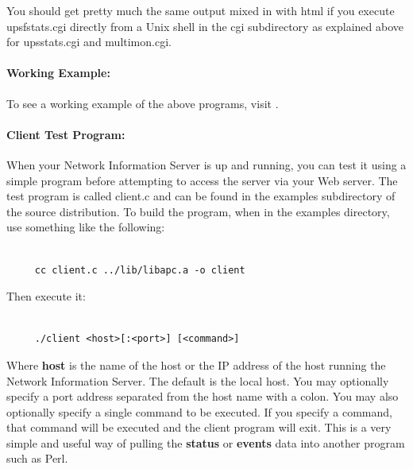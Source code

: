{{{{{{{{You should get pretty much the same output mixed in with html if you execute
upsfstats.cgi directly from a Unix shell in the cgi subdirectory as explained
above for upsstats.cgi and multimon.cgi. 

\label{Working-Example}

\paragraph*{Working Example:}

\label{index-CGI_002c-working-example-134}
\label{index-Example_002c-CGI-135}
To see a working example of the above programs, visit 
. 

\label{Client-Test-Program}

\paragraph*{Client Test Program:}

\label{index-Client-Test-program-136}
When your Network Information Server is up and running, you can test it using
a simple program before attempting to access the server via your Web server.
The test program is called client.c and can be found in the examples
subdirectory of the source distribution. To build the program, when in the
examples directory, use something like the following: 

\footnotesize
\begin{verbatim}
     
     cc client.c ../lib/libapc.a -o client
\end{verbatim}
\normalsize

Then execute it: 

\footnotesize
\begin{verbatim}
     
     ./client <host>[:<port>] [<command>]
\end{verbatim}
\normalsize

Where {\bf host} is the name of the host or the IP address of the host running
the Network Information Server. The default is the local host. You may
optionally specify a port address separated from the host name with a colon.
You may also optionally specify a single command to be executed. If you
specify a command, that command will be executed and the client program will
exit. This is a very simple and useful way of pulling the {\bf status} or {\bf
events} data into another program such as Perl.  

}}}}}}}}
